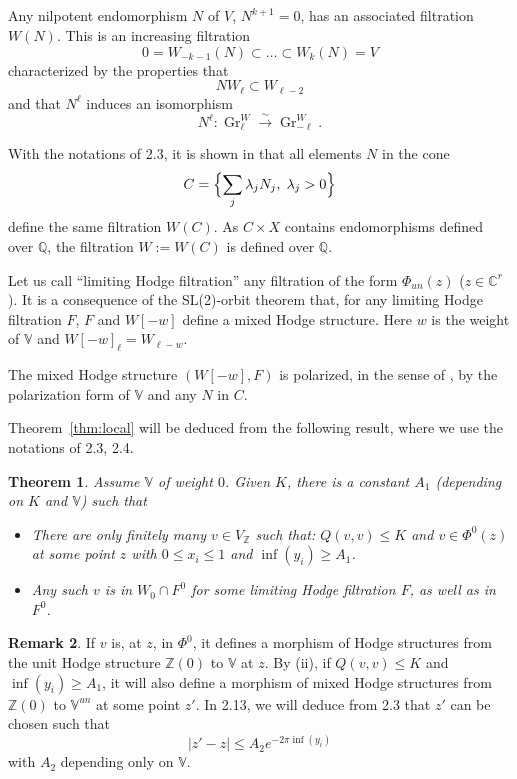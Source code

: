 \documentclass[11pt,a4paper]{article}
\theoremstyle{plain}
\newtheorem{theorem}{Theorem}[section]
\theoremstyle{definition}
\newtheorem{remark}[theorem]{Remark}
\DeclareMathOperator{\Gr}{Gr}
\begin{document}
\subsection{}
Any nilpotent endomorphism $N$ of $V$, $N^{k+1}=0$, has an associated filtration $W(N)$. This is an increasing filtration
\[
0=W_{-k-1}(N)\subset\dots\subset W_k(N)=V
\]
characterized by the properties that
\[
NW_{\ell}\subset W_{\ell-2}
\]
and that $N^{\ell}$ induces an isomorphism
\[
N^{\ell}:\Gr_{\ell}^W\xrightarrow{\sim}\Gr_{-\ell}^W.
\]

With the notations of 2.3, it is shown in \cite{cks} that all elements $N$ in the cone
\[
C=\Bigl\{\sum_j \lambda_j N_j,\; \lambda_j>0\Bigr\}
\]
define the same filtration $W(C)$. As $C\times X$ contains endomorphisms defined over $\mathbb{Q}$, the filtration $W:=W(C)$ is defined over $\mathbb{Q}$.

Let us call ``limiting Hodge filtration'' any filtration of the form $\Phi_{un}(z)$ ($z\in\mathbb{C}^r$). It is a consequence of the SL(2)-orbit theorem \cite{schmid} that, for any limiting Hodge filtration $F$, $F$ and $W[-w]$ define a mixed Hodge structure. Here $w$ is the weight of $\mathbb{V}$ and $W[-w]_{\ell}=W_{\ell-w}$.

The mixed Hodge structure $(W[-w],F)$ is polarized, in the sense of \cite{cks}, by the polarization form of $\mathbb{V}$ and any $N$ in $C$.

Theorem~\ref{thm:local} will be deduced from the following result, where we use the notations of 2.3, 2.4.

\begin{theorem}\label{thm:finite}
Assume $\mathbb{V}$ of weight $0$. Given $K$, there is a constant $A_1$ (depending on $K$ and $\mathbb{V}$) such that
\begin{itemize}
\item[(i)] There are only finitely many $v\in V_{\mathbb{Z}}$ such that: $Q(v,v)\leq K$ and $v\in\Phi^0(z)$ at some point $z$ with $0\leq x_i\leq 1$ and $\inf(y_i)\geq A_1$.
\item[(ii)] Any such $v$ is in $W_0\cap F^0$ for some limiting Hodge filtration $F$, as well as in $F^0$.
\end{itemize}
\end{theorem}

\begin{remark}\label{rem:mixed}
If $v$ is, at $z$, in $\Phi^0$, it defines a morphism of Hodge structures from the unit Hodge structure $\mathbb{Z}(0)$ to $\mathbb{V}$ at $z$. By (ii), if $Q(v,v)\leq K$ and $\inf(y_i)\geq A_1$, it will also define a morphism of mixed Hodge structures from $\mathbb{Z}(0)$ to $\mathbb{V}^{un}$ at some point $z'$. In 2.13, we will deduce from 2.3 that $z'$ can be chosen such that
\[
|z'-z|\leq A_2 e^{-2\pi\inf(y_i)}
\]
with $A_2$ depending only on $\mathbb{V}$.
\end{remark}
\end{document}
